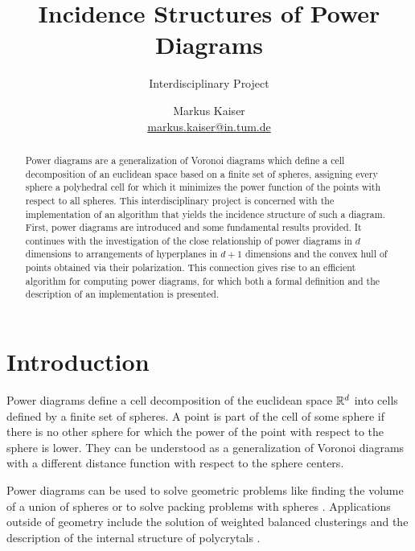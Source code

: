




\title{Incidence Structures of Power Diagrams}
\subtitle{Interdisciplinary Project}
\author{%
    \texorpdfstring{Markus Kaiser\\\href{mailto:markus.kaiser@in.tum.de}{markus.kaiser@in.tum.de}}{Markus Kaiser}}
\publishers{Technische Universität München}


\maketitle
\thispagestyle{empty}
\vfill
\begin{abstract}
    Power diagrams are a generalization of Voronoi diagrams which define a cell decomposition of an euclidean space based on a finite set of spheres, assigning every sphere a polyhedral cell for which it minimizes the power function of the points with respect to all spheres.
    This interdisciplinary project is concerned with the implementation of an algorithm that yields the incidence structure of such a diagram.
    First, power diagrams are introduced and some fundamental results provided.
    It continues with the investigation of the close relationship of power diagrams in $d$ dimensions to arrangements of hyperplanes in $d+1$ dimensions and the convex hull of points obtained via their polarization.
    This connection gives rise to an efficient algorithm for computing power diagrams, for which both a formal definition and the description of an implementation is presented.
\end{abstract}
\vfill

\clearpage
\tableofcontents

\section{Introduction}
\label{sec:introduction}
Power diagrams define a cell decomposition of the euclidean space $\mathbb{R}^d$ into cells defined by a finite set of spheres.
A point is part of the cell of some sphere if there is no other sphere for which the power of the point with respect to the sphere is lower.
They can be understood as a generalization of Voronoi diagrams with a different distance function with respect to the sphere centers.

Power diagrams can be used to solve geometric problems like finding the volume of a union of spheres \cite{avis1988computing} or to solve packing problems with spheres \cite{toth2013lagerungen}.
Applications outside of geometry include the solution of weighted balanced clusterings \cite{brieden2012optimal} and the description of the internal structure of polycrytals \cite{alpers2015generalized}.

